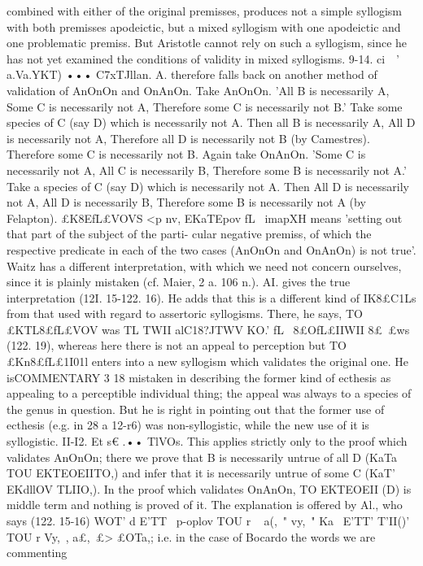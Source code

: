 {combined with either of the original premisses, produces not a
simple syllogism with both premisses apodeictic, but a mixed
syllogism with one apodeictic and one problematic premiss. But
Aristotle cannot rely on such a syllogism, since he has not yet
examined the conditions of validity in mixed syllogisms.
9-14. ci~~' a.Va.YKT) ••• C7xTJllan. A. therefore falls back on
another method of validation of AnOnOn and OnAnOn. Take
AnOnOn. 'All B is necessarily A, Some C is necessarily not A,
Therefore some C is necessarily not B.' Take some species of C
(say D) which is necessarily not A. Then all B is necessarily A, All
D is necessarily not A, Therefore all D is necessarily not B (by
Camestres). Therefore some C is necessarily not B.
Again take OnAnOn. 'Some C is necessarily not A, All C is
necessarily B, Therefore some B is necessarily not A.' Take
a species of C (say D) which is necessarily not A. Then All D is
necessarily not A, All D is necessarily B, Therefore some B is
necessarily not A (by Felapton). £K8EfL£VOVS <p nv, EKaTEpov fL~
imapXH means 'setting out that part of the subject of the parti-
cular negative premiss, of which the respective predicate in each
of the two cases (AnOnOn and OnAnOn) is not true'.
Waitz has a different interpretation, with which we need not
concern ourselves, since it is plainly mistaken (cf. Maier, 2 a.
106 n.). AI. gives the true interpretation (12I. 15-122. 16). He
adds that this is a different kind of IK8£C1Ls from that used with
regard to assertoric syllogisms. There, he says, TO £KTL8£fL£VOV
was TL TWII alC18?JTWV KO.' fL~ 8£OfL£IIWII 8£~£ws (122. 19), whereas
here there is not an appeal to perception but TO £Kn8£fL£1I01l enters
into a new syllogism which validates the original one. He isCOMMENTARY
3 18
mistaken in describing the former kind of ecthesis as appealing
to a perceptible individual thing; the appeal was always to a
species of the genus in question. But he is right in pointing out
that the former use of ecthesis (e.g. in 28 a 12-r6) was non-syllogistic,
while the new use of it is syllogistic.
II-I2. Et s€ .•• TlVOs. This applies strictly only to the proof
which validates AnOnOn; there we prove that B is necessarily
untrue of all D (KaTa TOU EKTEOEIITO,) and infer that it is necessarily
untrue of some C (KaT' EKdllOV TLIIO,). In the proof which validates
OnAnOn, TO EKTEOEII (D) is middle term and nothing is proved of it.
The explanation is offered by Al., who says (122. 15-16) WOT' d
E'TT~ p-oplov TOU r ~ a(,~" vy,~" Ka~ E'TT' T'II()' TOU r Vy,~, a£,~£>
£OTa,; i.e. in the case of Bocardo the words we are commenting
}
